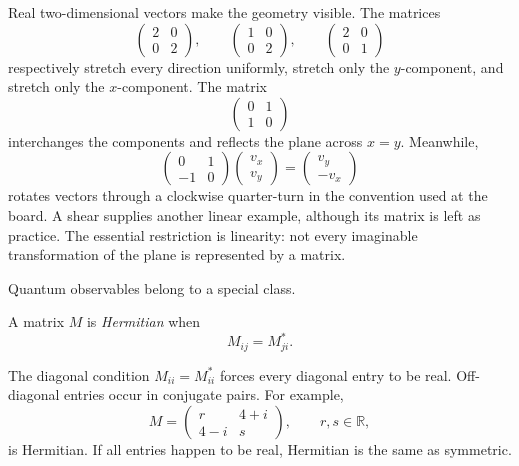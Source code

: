 Real two-dimensional vectors make the geometry visible. The matrices
\begin{equation}
  \begin{pmatrix}2&0\\0&2\end{pmatrix},
  \qquad
  \begin{pmatrix}1&0\\0&2\end{pmatrix},
  \qquad
  \begin{pmatrix}2&0\\0&1\end{pmatrix}
\end{equation}
respectively stretch every direction uniformly, stretch only the \(y\)-component, and stretch only the \(x\)-component. The matrix
\begin{equation}
  \begin{pmatrix}0&1\\1&0\end{pmatrix}
\end{equation}
interchanges the components and reflects the plane across \(x=y\). Meanwhile,
\begin{equation}
  \begin{pmatrix}0&1\\-1&0\end{pmatrix}
  \begin{pmatrix}v_x\\v_y\end{pmatrix}
  =
  \begin{pmatrix}v_y\\-v_x\end{pmatrix}
  \label{eq:l02-quarter-turn}
\end{equation}
rotates vectors through a clockwise quarter-turn in the convention used at the board. A shear supplies another linear example, although its matrix is left as practice. The essential restriction is linearity: not every imaginable transformation of the plane is represented by a matrix.

Quantum observables belong to a special class.

\begin{definition}
A matrix \(M\) is \emph{Hermitian} when
\begin{equation}
  M_{ij}=M_{ji}^*.
  \label{eq:l02-hermitian-condition}
\end{equation}
\end{definition}

The diagonal condition \(M_{ii}=M_{ii}^*\) forces every diagonal entry to be real. Off-diagonal entries occur in conjugate pairs. For example,
\begin{equation}
  M=
  \begin{pmatrix}
    r&4+i\\
    4-i&s
  \end{pmatrix},
  \qquad r,s\in\mathbb R,
  \label{eq:l02-hermitian-example}
\end{equation}
is Hermitian. If all entries happen to be real, Hermitian is the same as symmetric.

